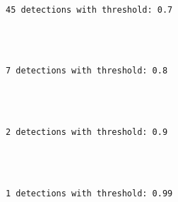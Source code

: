 \documentclass[11pt]{article}
\begin{document}
    \begin{center}
    \end{center}
    { \hspace*{\fill} \\}
    
    \begin{Verbatim}[commandchars=\\\{\}]
45 detections with threshold: 0.7


    \end{Verbatim}

    \begin{center}
    \end{center}
    { \hspace*{\fill} \\}
    
    \begin{Verbatim}[commandchars=\\\{\}]
7 detections with threshold: 0.8


    \end{Verbatim}

    \begin{center}
    \end{center}
    { \hspace*{\fill} \\}
    
    \begin{Verbatim}[commandchars=\\\{\}]
2 detections with threshold: 0.9


    \end{Verbatim}

    \begin{center}
    \end{center}
    { \hspace*{\fill} \\}
    
    \begin{Verbatim}[commandchars=\\\{\}]
1 detections with threshold: 0.99


    \end{Verbatim}

    \begin{center}
    \end{center}
    { \hspace*{\fill} \\}
    
\end{document}
